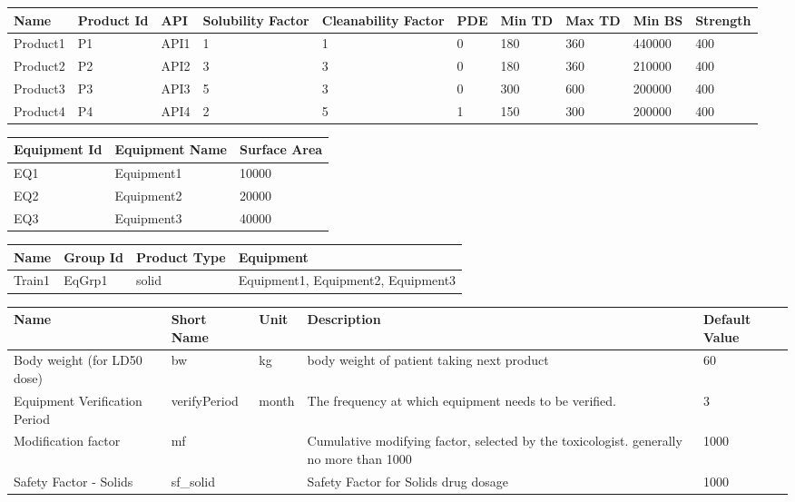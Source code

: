 \documentclass{article}
\begin{document}
        \begin{longtable}[l]{|p{1.5cm}|p{1.7cm}|p{1cm}|p{1.5cm}|p{1.7cm}|p{1cm}|p{1cm}|p{1cm}|p{1cm}|p{1.5cm}|}

\hline
Name & Product Id & API & Solubility Factor & Cleanability Factor & PDE & Min TD & Max TD & Min BS & Strength\\
\hline

Product1 & P1 & API1 & 1 & 1 & 0 & 180 & 360 & 440000 & 400\\
\hline
Product2 & P2 & API2 & 3 & 3 & 0 & 180 & 360 & 210000 & 400\\
\hline
Product3 & P3 & API3 & 5 & 3 & 0 & 300 & 600 & 200000 & 400\\
\hline
Product4 & P4 & API4 & 2 & 5 & 1 & 150 & 300 & 200000 & 400\\
\hline

    \end{longtable}
    
        \begin{longtable}[l]{|p{2.5cm}|p{3cm}|p{3.5cm}|}

\hline
Equipment Id & Equipment Name & Surface Area\\
\hline

EQ1 & Equipment1 & 10000\\
\hline
EQ2 & Equipment2 & 20000\\
\hline
EQ3 & Equipment3 & 40000\\
\hline

    \end{longtable}
    
        \begin{longtable}[l]{|p{2.5cm}|p{1.5cm}|p{1.8cm}|p{6cm}|}

\hline
Name & Group Id & Product Type & Equipment\\
\hline

Train1 & EqGrp1 & solid & Equipment1, Equipment2, Equipment3\\
\hline

    \end{longtable}
    
        \begin{longtable}[l]{|p{2.5cm}|p{2cm}|p{1.2cm}|p{8cm}|p{2cm}|}

\hline
Name & Short Name & Unit & Description & Default Value\\
\hline

Body weight (for LD50 dose) & bw & kg & body weight of patient taking next product & 60\\
\hline
Equipment Verification Period & verifyPeriod & month & The frequency at which equipment needs to be verified. & 3\\
\hline
Modification factor & mf &  & Cumulative modifying factor, selected by the toxicologist. generally no more than 1000 & 1000\\
\hline
Safety Factor - Solids & sf\_solid &  & Safety Factor for Solids drug dosage & 1000\\
\hline

    \end{longtable}
    
\end{document}
